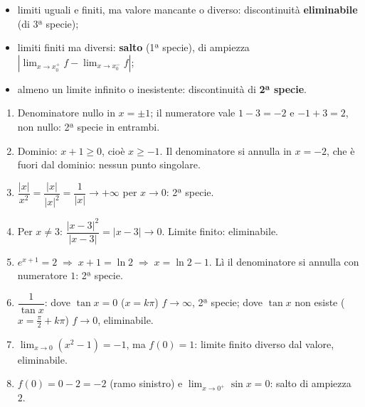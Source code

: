 \begin{question}[ID=2.4, subtitle={Punti singolari — serie 4}, tags={continuità, punti singolari}, difficulty=media]
\begin{explanation}
\begin{itemize}
    \item limiti uguali e finiti, ma valore mancante o diverso: discontinuità \textbf{eliminabile} (di 3ª specie);
    \item limiti finiti ma diversi: \textbf{salto} (1ª specie), di ampiezza $|\lim_{x\to x_0^+}f-\lim_{x\to x_0^-}f|$;
    \item almeno un limite infinito o inesistente: discontinuità di \textbf{2ª specie}.
\end{itemize}
\begin{enumerate}[label=\arabic*)]
    \item Denominatore nullo in $x=\pm1$; il numeratore vale $1-3=-2$ e $-1+3=2$, non nullo: 2ª specie in entrambi.
    \item Dominio: $x+1\geq0$, cioè $x\geq-1$. Il denominatore si annulla in $x=-2$, che è fuori dal dominio: nessun punto singolare.
    \item $\dfrac{|x|}{x^2}=\dfrac{|x|}{|x|^2}=\dfrac{1}{|x|}\to+\infty$ per $x\to0$: 2ª specie.
    \item Per $x\neq3$: $\dfrac{|x-3|^2}{|x-3|}=|x-3|\to0$. Limite finito: eliminabile.
    \item $e^{x+1}=2 \;\Rightarrow\; x+1=\ln2 \;\Rightarrow\; x=\ln2-1$. Lì il denominatore si annulla con numeratore $1$: 2ª specie.
    \item $\dfrac{1}{\tan x}$: dove $\tan x=0$ ($x=k\pi$) $f\to\infty$, 2ª specie; dove $\tan x$ non esiste ($x=\tfrac\pi2+k\pi$) $f\to0$, eliminabile.
    \item $\displaystyle\lim_{x\to0}(x^2-1)=-1$, ma $f(0)=1$: limite finito diverso dal valore, eliminabile.
    \item $f(0)=0-2=-2$ (ramo sinistro) e $\displaystyle\lim_{x\to0^+}\sin x=0$: salto di ampiezza $2$.
\end{enumerate}
\end{explanation}
\end{question}


